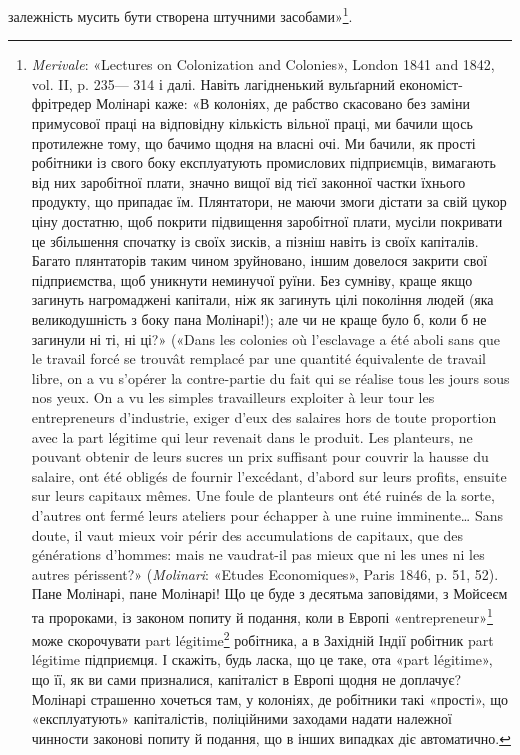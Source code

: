 залежність мусить бути створена штучними засобами»\footnote{
\emph{Merivale}: «Lectures on Colonization and Colonies», London 1841 and 1842, vol. II, p. 235— 314 і
далі. Навіть лагідненький вульґарний економіст-фрітредер Молінарі каже: «В колоніях, де рабство
скасовано без заміни примусової праці на відповідну кількість вільної праці, ми бачили щось
протилежне тому, що бачимо щодня на власні очі. Ми
бачили, як прості робітники із свого боку експлуатують промислових підприємців, вимагають від них
заробітної плати, значно вищої від тієї законної частки їхнього продукту, що припадає їм.
Плянтатори, не маючи змоги дістати за свій цукор ціну достатню, щоб покрити підвищення заробітної
плати, мусіли покривати це збільшення спочатку із своїх зисків, а пізніш навіть із своїх капіталів.
Багато плянтаторів таким
чином зруйновано, іншим довелося закрити свої підприємства, щоб уникнути
неминучої руїни. Без сумніву, краще якщо загинуть нагромаджені капітали, ніж як загинуть цілі
покоління людей (яка великодушність з боку пана Молінарі!); але чи не краще було б, коли б не
загинули ні ті, ні ці?» («Dans les colonies où l’esclavage a été aboli sans que le travail forcé se
trouvât remplacé par une quantité équivalente de travail libre,
on a vu s’opérer la contre-partie du fait qui se réalise tous les jours sous nos yeux. On a vu les
simples travailleurs exploiter à leur tour les entrepreneurs d’industrie, exiger d’eux des salaires
hors de toute proportion avec la part légitime qui leur revenait dans le produit. Les planteurs, ne
pouvant obtenir de leurs sucres un prix suffisant pour couvrir la hausse du salaire, ont été obligés
de fournir l’excédant, d’abord sur leurs profits, ensuite sur leurs
capitaux mêmes. Une foule de planteurs ont été ruinés de la sorte, d’autres ont fermé leurs ateliers
pour échapper à une ruine imminente\dots{} Sans doute, il vaut mieux voir périr des accumulations de
capitaux, que des générations d'hommes: mais ne vaudrat-il pas mieux que ni les unes ni les autres périssent?» (\emph{Molinari}: «Etudes Economiques», Paris 1846, p. 51, 52). Пане Молінарі,
пане Молінарі! Що це буде з десятьма заповідями, з Мойсеєм та пророками, із законом попиту й
подання, коли в Европі «entrepreneur»\footnote*{
підприємець. \emph{Ред.}
} може скорочувати part légitime\footnote*{
законну пайку. \emph{Ред.}
} робітника, а в Західній
Індії робітник part légitime підприємця. І скажіть, будь ласка, що це таке, ота «part légitime», що
її, як ви сами призналися, капіталіст
в Европі щодня не доплачує? Молінарі страшенно хочеться там, у колоніях, де робітники такі «прості»,
що «експлуатують» капіталістів, поліційними заходами надати належної чинности законові попиту й
подання, що в інших випадках діє автоматично.
}.

